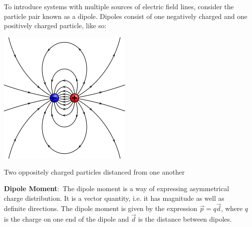 \documentclass[nobib]{tufte-handout}
\newcommand{\defn}[2]{\noindent\textbf{#1}:\ #2}
\begin{document}
To introduce systems with multiple sources of electric field lines, consider
the particle pair known as a dipole. Dipoles consist of one negatively charged
and one positively charged particle, like so:
\begin{marginfigure}
    \centering
    \includegraphics[width=\textwidth / 2]{images/VFPt_dipole_electric.svg.png}
    \caption{Two oppositely charged particles distanced from one another}
    \label{fig:dipole}
\end{marginfigure}

\defn{Dipole Moment}{The dipole moment is a way of expressing asymmetrical charge distribution.
It is a vector quantity, i.e. it has magnitude as well as definite directions.} The
dipole moment is given by the expression $\vec{p} = q\vec{d}$, where $q$ is
the charge on one end of the dipole and $\vec{d}$ is the distance between dipoles.
\end{document}
